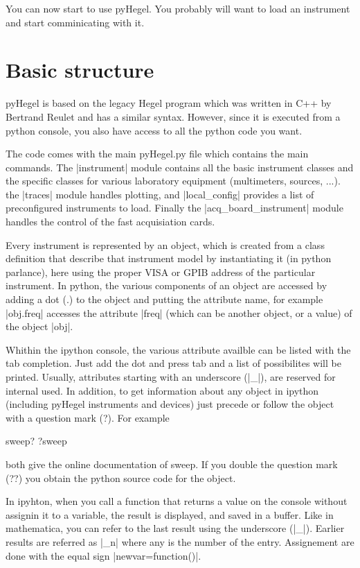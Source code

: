 \documentclass[letterpaper,12pt]{article}
\begin{document}
You can now start to use pyHegel. You probably will want to load an instrument
and start comminicating with it.
\section{Basic structure}
pyHegel is based on the legacy Hegel program which was written in C++ by Bertrand Reulet and has a similar syntax.
However, since it is executed from a python console, you also have access to all
the python code you want.

The code comes with the main pyHegel.py file which contains the main commands.
The |instrument| module contains all the basic instrument classes and the
specific classes for various laboratory equipment (multimeters, sources, ...).
the |traces| module handles plotting, and |local_config| provides a list of
preconfigured instruments to load. Finally the |acq_board_instrument| module
handles the control of the fast acquisiation cards.

Every instrument is represented by an object, which is created from a class definition
that describe that instrument model
by instantiating it (in python parlance), here using the proper
VISA or GPIB address of the particular instrument. In python, the various 
components of an object are accessed by adding a dot (.) to the object and
putting the attribute name, for example |obj.freq| accesses the attribute |freq| (which can be another object, or a value) of the object |obj|.

Whithin the ipython console, the various attribute availble can be listed with
the tab completion. Just add the dot and press tab and a list of possibilites
will be printed. Usually, attributes starting with an underscore (|_|), are
reserved for internal used. In addition, to get information about any object
in ipython (including pyHegel instruments and devices) just precede or follow
the object with a question mark (?). For example
\begin{code}
sweep?
?sweep
\end{code}
both give the online documentation of sweep.
If you double the question mark (??) you obtain the python source code for
the object.

In ipyhton, when you call a function that returns a value on the console without
assignin it to a variable, the result is displayed, and saved in a buffer.
Like in mathematica, you can refer to the last result using the underscore (|_|).
Earlier results are referred as |_n| where any is the number of the entry.
Assignement are done with the equal sign |newvar=function()|.
\end{document}
